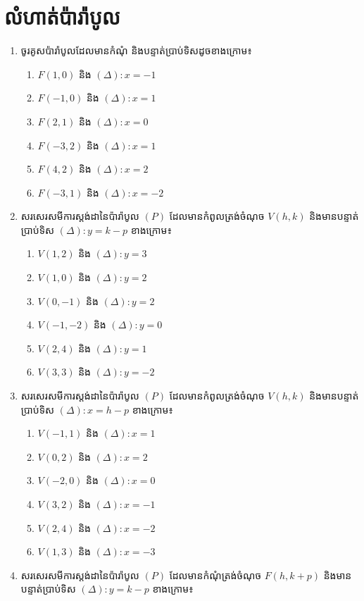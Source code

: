 \section{លំហាត់ប៉ារ៉ាបូល}
%
\begin{enumerate}
  \item ចូរគូសប៉ារ៉ាបូលដែលមានកំណុំ និងបន្ទាត់ប្រាប់ទិសដូចខាងក្រោម៖
  \begin{enumerate}[2]
    \item $ F(1,0) $ និង $ (\Delta):x=-1 $
    \item $ F(-1,0) $ និង $ (\Delta):x=1 $
    \item $ F(2,1) $ និង $ (\Delta):x=0 $
    \item $ F(-3,2) $ និង $ (\Delta):x=1 $
    \item $ F(4,2) $ និង $ (\Delta):x=2 $
    \item $ F(-3,1) $ និង $ (\Delta):x=-2 $
  \end{enumerate}
	\item សរសេរសមីការស្តង់ដានៃប៉ារ៉ាបូល $ (P) $ ដែលមានកំពូលត្រង់ចំណុច $ V(h,k) $ និងមានបន្ទាត់ប្រាប់ទិស $ (\Delta):y=k-p $ ខាងក្រោម៖
	\begin{enumerate}[2]
		\item $ V(1,2) $ និង $ (\Delta):y=3 $
		\item $ V(1,0) $ និង $ (\Delta):y=2 $
		\item $ V(0,-1) $ និង $ (\Delta):y=2 $
		\item $ V(-1,-2) $ និង $ (\Delta):y=0 $
		\item $ V(2,4) $ និង $ (\Delta):y=1 $
		\item $ V(3,3) $ និង $ (\Delta):y=-2 $
	\end{enumerate}
	\item សរសេរសមីការស្តង់ដានៃប៉ារ៉ាបូល $ (P) $ ដែលមានកំពូលត្រង់ចំណុច $ V(h,k) $ និងមានបន្ទាត់ប្រាប់ទិស $ (\Delta):x=h-p $ ខាងក្រោម៖
	\begin{enumerate}[2]
		\item $ V(-1,1) $ និង $ (\Delta):x=1 $
		\item $ V(0,2) $ និង $ (\Delta):x=2 $
		\item $ V(-2,0) $ និង $ (\Delta):x=0 $
		\item $ V(3,2) $ និង $ (\Delta):x=-1 $
		\item $ V(2,4) $ និង $ (\Delta):x=-2 $
		\item $ V(1,3) $ និង $ (\Delta):x=-3 $
	\end{enumerate}
	\item សរសេរសមីការស្តង់ដានៃប៉ារ៉ាបូល $ (P) $ ដែលមានកំណុំត្រង់ចំណុច $ F(h,k+p) $ និងមានបន្ទាត់ប្រាប់ទិស $ (\Delta):y=k-p $ ខាងក្រោម៖

\end{enumerate}
